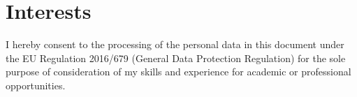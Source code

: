 \documentclass[a4paper, 11pt, sans]{moderncv}
\begin{document}

\renewcommand{\listitemsymbol}{-~} %

\section{Interests}


\vfill
I hereby consent to the processing of the personal data in this document under the EU Regulation 2016/679 (General Data Protection Regulation) for the sole purpose of consideration of my skills and experience for academic or professional opportunities.
\end{document}
